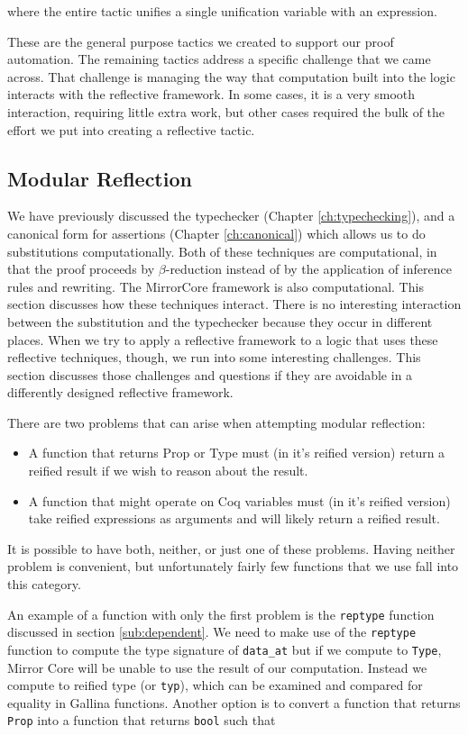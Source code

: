 \documentclass{puthesis}
\begin{document}
where the entire tactic unifies a single unification variable with an expression.

These are the general purpose tactics we created to support our proof
automation. The remaining tactics address a specific challenge that we
came across. That challenge is managing the way that computation built
into the logic interacts with the reflective framework. In some cases,
it is a very smooth interaction, requiring little extra work, but
other cases required the bulk of the effort we put into creating a
reflective tactic.

\subsection{Modular Reflection}

We have previously discussed the typechecker (Chapter
\ref{ch:typechecking}), and a canonical form for assertions (Chapter
\ref{ch:canonical}) which allows us to do substitutions
computationally.  Both of these techniques are computational, in that
the proof proceeds by $\beta$-reduction instead of by the application of
inference rules and rewriting.  The MirrorCore framework is also
computational. This section discusses how these techniques
interact. There is no interesting interaction between the substitution
and the typechecker because they occur in different places. When we
try to apply a reflective framework to a logic that uses these
reflective techniques, though, we run into some interesting
challenges. This section discusses those challenges and questions if
they are avoidable in a differently designed reflective framework.

There are two problems that can arise when attempting modular reflection:

\begin{itemize}
\item A function that returns Prop or Type must (in it's reified version) return a reified
  result if we wish to reason about the result.
\item A function that might operate on Coq variables must (in it's
  reified version) take reified
  expressions as arguments and will likely return a reified result.
\end{itemize}

It is possible to have both, neither, or just one of these problems.
Having neither problem is convenient, but unfortunately fairly few
functions that we use fall into this category. 

An example of a function with only the first problem is the
\lstinline|reptype| function discussed in section
\ref{sub:dependent}. We need to make use of the \lstinline|reptype|
function to compute the type signature of \lstinline|data_at| but if we
compute to \lstinline|Type|, Mirror Core will be unable to use the
result of our computation. Instead we compute to reified type (or
\lstinline|typ|), which can be examined and compared for equality in
Gallina functions. Another option is to convert a function that
returns \lstinline|Prop| into a function that returns \lstinline|bool| such that
\end{document}
